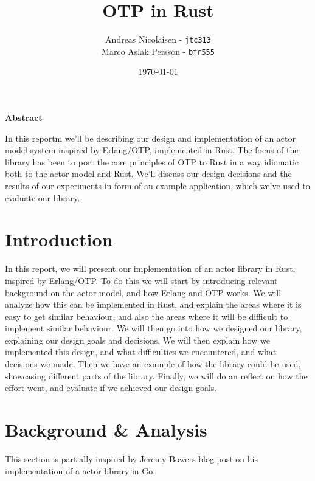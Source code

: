\documentclass[a4paper]{article}
\title{OTP in Rust}
\author{Andreas Nicolaisen - \texttt{jtc313} \\ Marco Aslak Persson - \texttt{bfr555}}
\date{\today}
\begin{document}

\maketitle

\begin{center}
  \large{\bf Abstract}\\
  \vspace{0.5cm}
  \begin{minipage}[h]{0.6\linewidth}
    In this reportm we'll be describing our design and implementation of an actor
    model system inspired by Erlang/OTP, implemented in Rust. The focus of the
    library has been to port the core principles of OTP to Rust in a way
    idiomatic both to the actor model and Rust. We'll discuss our design
    decisions and the results of our experiments in form of an example
    application, which we've used to evaluate our library.
  \end{minipage}
\end{center}
\newpage

\tableofcontents
\newpage

\setcounter{page}{1}

\section{Introduction}
In this report, we will present our implementation of an actor library in Rust,
inspired by Erlang/OTP. To do this we will start by introducing relevant
background on the actor model, and how Erlang and OTP works. We will analyze how
this can be implemented in Rust, and explain the areas where it is easy to get
similar behaviour, and also the areas where it will be difficult to implement
similar behaviour. We will then go into how we designed our library, explaining
our design goals and decisions. We will then explain how we implemented this
design, and what difficulties we encountered, and what decisions we made. Then
we have an example of how the library could be used, showcasing different parts
of the library. Finally, we will do an reflect on how the effort went, and
evaluate if we achieved our design goals.

\section{Background \& Analysis}
This section is partially inspired by Jeremy Bowers blog post on his
implementation of a actor library in Go\cite{SuturePost}.
\end{document}
